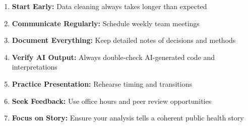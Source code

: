 \documentclass[11pt]{article}
\begin{document}
\begin{enumerate}
\item \textbf{Start Early:} Data cleaning always takes longer than expected
\item \textbf{Communicate Regularly:} Schedule weekly team meetings
\item \textbf{Document Everything:} Keep detailed notes of decisions and methods
\item \textbf{Verify AI Output:} Always double-check AI-generated code and interpretations
\item \textbf{Practice Presentation:} Rehearse timing and transitions
\item \textbf{Seek Feedback:} Use office hours and peer review opportunities
\item \textbf{Focus on Story:} Ensure your analysis tells a coherent public health story
\end{enumerate}
\end{document}
